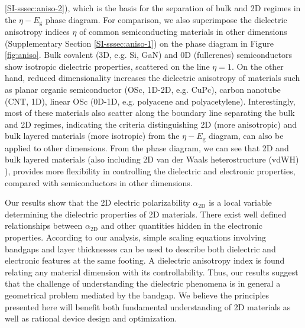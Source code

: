 \documentclass[journal=ancac3,manuscript=article,email=true,hyperref=true,keywords=false]{achemso}
\begin{document}
\ref{SI-sssec:aniso-2}), which is the basis for the separation of bulk
and 2D regimes in the $\eta-E_{\mathrm{g}}$ phase diagram.  For
comparison, we also superimpose the dielectric anisotropy indices
$\eta$ of common semiconducting materials in other dimensions 
(Supplementary Section \ref{SI-sssec:aniso-1}) on the phase diagram in Figure
\ref{fig:aniso}. Bulk covalent (3D, e.g. Si, GaN) and 0D (fullerenes)
semiconductors show isotropic dielectric properties, scattered on the
line $\eta=1$. On the other hand, reduced dimensionality increases the
dielectric anisotropy of materials such as planar organic
semiconductor (OSc, 1D-2D, e.g. CuPc), carbon nanotube (CNT, 1D),
linear OSc (0D-1D, e.g. polyacene and polyacetylene). Interestingly,
most of these materials also scatter along the boundary line
separating the bulk and 2D regimes, indicating the criteria
distinguishing 2D (more anisotropic) and bulk layered materials (more
isotropic) from the $\eta-E_{\mathrm{g}}$ diagram, can also be applied
to other dimensions. From the phase diagram, we can see that 2D and
bulk layered materials (also including 2D van der Waals
heterostructure (vdWH) \cite{Novoselov_2016}), provides more
flexibility in controlling the dielectric and electronic properties,
compared with semiconductors in other dimensions.  

%



Our results show that the 2D electric polarizability
$\alpha_{\mathrm{2D}}$ is a local variable determining the dielectric
properties of 2D materials.  There exist well defined relationships
between $\alpha_{\mathrm{2D}}$ and other quantities hidden in the
electronic properties.  According to our analysis, simple scaling
equations involving bandgaps and layer thicknesses can be used to
describe both dielectric and electronic features at the same
footing. A dielectric anisotropy index is found relating any material
dimension with its controllability.  Thus, our results suggest that
the challenge of understanding the dielectric phenomena is in general
a geometrical problem mediated by the bandgap. We believe the
principles presented here will benefit both fundamental understanding
of 2D materials as well as rational device design and optimization.
\end{document}

